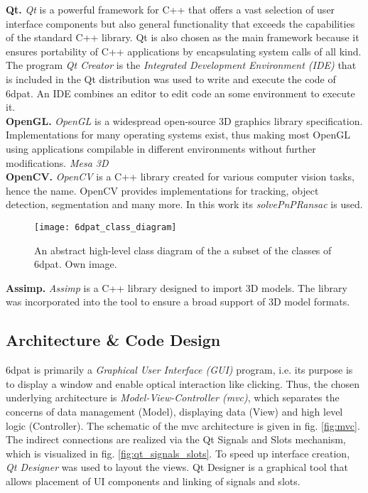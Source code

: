 \noindent\textbf{Qt.} \textit{Qt} \cite{qt} is a powerful framework for C++ that offers a vast selection of user interface components but also general functionality that exceeds the capabilities of the standard C++ library. Qt is also chosen as the main framework because it ensures portability of C++ applications by encapsulating system calls of all kind. The program \textit{Qt Creator} is the \textit{Integrated Development Environment (IDE)} that is included in the Qt distribution was used to write and execute the code of \gls{6dpat}. An IDE combines an editor to edit code an some environment to execute it. \\

\noindent\textbf{OpenGL.} \textit{OpenGL} \cite{opengl} is a widespread open-source 3D graphics library specification. Implementations for many operating systems exist, thus making most OpenGL using applications compilable in different environments without further modifications. \textit{Mesa 3D} \\

\noindent\textbf{OpenCV.} \textit{OpenCV} \cite{opencv} is a C++ library created for various computer vision tasks, hence the name. OpenCV provides implementations for tracking, object detection, segmentation and many more. In this work its \textit{solvePnPRansac} is used. \\

\begin{figure}[!tbp]
	\centering
    \texttt{[image: 6dpat\_class\_diagram]}
    \caption{An abstract high-level class diagram of the a subset of the classes of \gls{6dpat}. Own image.}
    \label{fig:6dpat_class_diagram}
\end{figure} 

\noindent\textbf{Assimp.} \textit{Assimp} \cite{assimp} is a C++ library designed to import 3D models. The library was incorporated into the tool to ensure a broad support of 3D model formats.

\subsection{Architecture \& Code Design}

\gls{6dpat} is primarily a \textit{Graphical User Interface (GUI)} program, i.e. its purpose is to display a window and enable optical interaction like clicking. Thus, the chosen underlying architecture is \textit{Model-View-Controller (\gls{mvc})}, which separates the concerns of data management (Model), displaying data (View) and high level logic (Controller). The schematic of the \gls{mvc} architecture is given in fig. \ref{fig:mvc}. The indirect connections are realized via the Qt Signals and Slots mechanism, which is visualized in fig. \ref{fig:qt_signals_slots}. To speed up interface creation, \textit{Qt Designer} was used to layout the views. Qt Designer is a graphical tool that allows placement of UI components and linking of signals and slots. \\

